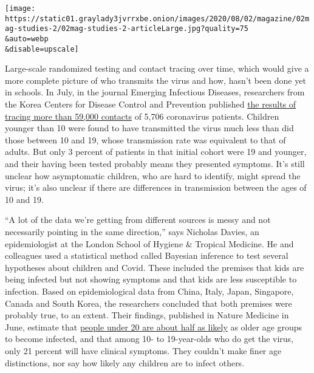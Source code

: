 \texttt{[image: https://static01.graylady3jvrrxbe.onion/images/2020/08/02/magazine/02mag-studies-2/02mag-studies-2-articleLarge.jpg?quality=75\\\&auto=webp\\\&disable=upscale]}

Large-scale randomized testing and contact tracing over time, which
would give a more complete picture of who transmits the virus and how,
hasn't been done yet in schools. In July, in the journal Emerging
Infectious Diseases, researchers from the Korea Centers for Disease
Control and Prevention published
\href{https://wwwnc.cdc.gov/eid/article/26/10/20-1315_article}{the
results of tracing more than 59,000 contacts} of 5,706 coronavirus
patients. Children younger than 10 were found to have transmitted the
virus much less than did those between 10 and 19, whose transmission
rate was equivalent to that of adults. But only 3 percent of patients in
that initial cohort were 19 and younger, and their having been tested
probably means they presented symptoms. It's still unclear how
asymptomatic children, who are hard to identify, might spread the virus;
it's also unclear if there are differences in transmission between the
ages of 10 and 19.

``A lot of the data we're getting from different sources is messy and
not necessarily pointing in the same direction,'' says Nicholas Davies,
an epidemiologist at the London School of Hygiene \& Tropical Medicine.
He and colleagues used a statistical method called Bayesian inference to
test several hypotheses about children and Covid. These included the
premises that kids are being infected but not showing symptoms and that
kids are less susceptible to infection. Based on epidemiological data
from China, Italy, Japan, Singapore, Canada and South Korea, the
researchers concluded that both premises were probably true, to an
extent. Their findings, published in Nature Medicine in June, estimate
that \href{https://www.nature.com/articles/s41591-020-0962-9}{people
under 20 are about half as likely} as older age groups to become
infected, and that among 10- to 19-year-olds who do get the virus, only
21 percent will have clinical symptoms. They couldn't make finer age
distinctions, nor say how likely any children are to infect others.

